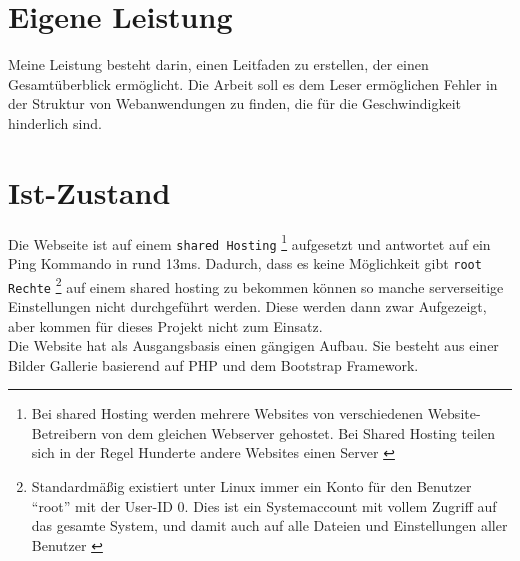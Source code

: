 
\section{Eigene Leistung} %
\label{sub:eigene_leistung}
	Meine Leistung besteht darin, einen Leitfaden zu erstellen, der einen Gesamtüberblick ermöglicht. Die Arbeit soll es dem Leser ermöglichen Fehler in der Struktur von Webanwendungen zu finden, die für die Geschwindigkeit hinderlich sind.



\section{Ist-Zustand} %
\label{sec:Ist-Zustand}
	Die Webseite ist auf einem \texttt{shared Hosting}
	\footnote{Bei shared Hosting werden mehrere Websites von verschiedenen Website-Betreibern von dem gleichen Webserver gehostet. Bei Shared Hosting teilen sich in der Regel Hunderte andere Websites einen Server \autocite{itWissen}} 
	aufgesetzt und antwortet auf ein Ping Kommando in rund 13ms. Dadurch, dass es keine Möglichkeit gibt \texttt{root Rechte} \footnote{Standardmäßig existiert unter Linux immer ein Konto für den Benutzer "`root"' mit der User-ID 0. Dies ist ein Systemaccount mit vollem Zugriff auf das gesamte System, und damit auch auf alle Dateien und Einstellungen aller Benutzer \autocite{ubuntu14}} auf einem shared hosting zu bekommen können so manche serverseitige Einstellungen nicht durchgeführt werden. Diese werden dann zwar Aufgezeigt, aber kommen für dieses Projekt nicht zum Einsatz.\\
	Die Website hat als Ausgangsbasis einen gängigen Aufbau. Sie besteht aus einer Bilder Gallerie basierend auf PHP und dem Bootstrap Framework.
